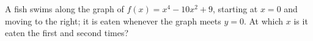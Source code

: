 A fish swims along the graph of $f(x)=x^4-10x^2+9$, starting at $x=0$ and moving to the right; it is eaten whenever the graph meets $y=0$. At which $x$ is it eaten the first and second times?
